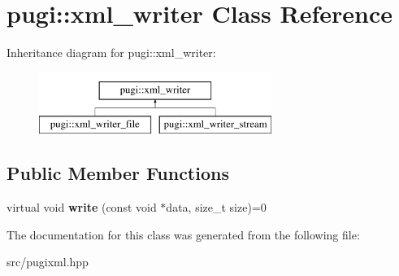 \hypertarget{classpugi_1_1xml__writer}{}\section{pugi\+:\+:xml\+\_\+writer Class Reference}
\label{classpugi_1_1xml__writer}
Inheritance diagram for pugi\+:\+:xml\+\_\+writer\+:\begin{figure}[H]
\begin{center}
\leavevmode
\includegraphics[height=2.000000cm]{classpugi_1_1xml__writer}
\end{center}
\end{figure}
\subsection*{Public Member Functions}
\begin{DoxyCompactItemize}
\item 
\mbox{\label{classpugi_1_1xml__writer_ab7d3b6a8499ceef7799158370e1c2617}} 
virtual void {\bfseries write} (const void $\ast$data, size\+\_\+t size)=0
\end{DoxyCompactItemize}


The documentation for this class was generated from the following file\+:\begin{DoxyCompactItemize}
\item 
src/pugixml.\+hpp\end{DoxyCompactItemize}
